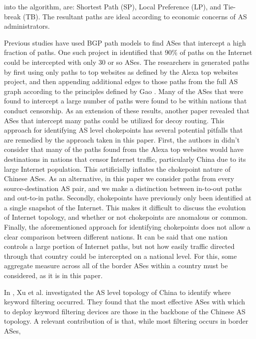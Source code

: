 \documentclass{article}
\begin{document}
\begin{multicols}{2}
into the algorithm, are: Shortest Path (SP), Local Preference (LP), and Tie-
break (TB). The resultant paths are ideal according to economic concerns of AS
administrators.     
\par
Previous studies have used BGP path models to find ASes that
intercept a high fraction of paths. One such project in \cite{throats}
identified that 90\% of paths on the Internet could be intercepted with only 30
or so ASes. The researchers in \cite{throats} generated paths by first using
only paths to top websites as defined by the Alexa top websites project,
and then appending additional edges to those paths from the full
AS graph according to the principles defined by Gao \cite{gao}. Many of the
ASes that were found to intercept a large number of paths were found to be
within nations that conduct censorship. As an extension of these results,
another paper \cite{decoy} revealed that ASes that intercept many paths could
be utilized for decoy routing. This approach for identifying AS level
chokepoints has several potential pitfalls that are remedied by the approach
taken in this paper. First, the authors in \cite{throats} didn't consider that
many of the paths found from the Alexa top websites would have destinations in
nations that censor Internet traffic, particularly China due to its large
Internet population. This artificially inflates the chokepoint nature of
Chinese ASes. As an alternative, in this paper we consider paths from every
source-destination AS pair, and we make a distinction between in-to-out paths
and out-to-in paths. Secondly, chokepoints have previously only been
identified at a single snapshot of the Internet. This makes it difficult to
discuss the evolution of Internet topology, and whether or not chokepoints are
anomalous or common. Finally, the aforementioned approach for identifying
chokepoints does not allow a clear comparison between different nations. It
can be said that one nation controls a large portion of Internet paths, but
not how easily traffic directed through that country could be intercepted on a
national level. For this, some aggregate measure across all of the border ASes
within a country must be considered, as it is in this paper.     
\par
In \cite{chinafiltering}, Xu et al. investigated the AS level topology of China
to identify where keyword filtering occurred. They found that the most
effective ASes with which to deploy keyword filtering devices are those in the
backbone of the Chinese AS topology. A relevant contribution of
\cite{chinafiltering} is that, while most filtering occurs in border ASes,

\end{multicols}
\end{document}
